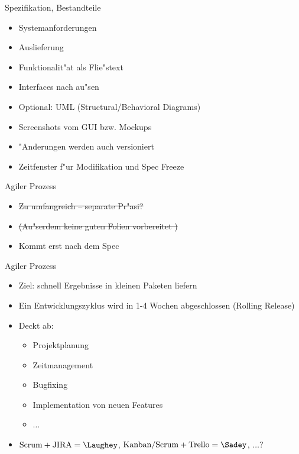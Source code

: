 \documentclass{beamer}
\begin{document}
\begin{frame}{Spezifikation, Bestandteile}
	\begin{itemize}
		\item Systemanforderungen
		\item Auslieferung
		\item Funktionalit"at als Flie"stext
		\item Interfaces nach au"sen
		\item Optional: UML (Structural/Behavioral Diagrams)
		\item Screenshots vom GUI bzw. Mockups
		\item "Anderungen werden auch versioniert
		\item Zeitfenster f"ur Modifikation und Spec Freeze
	\end{itemize}
\end{frame}

\begin{frame}{Agiler Prozess}
	\begin{itemize}
		\item \sout{Zu umfangreich -- separate Pr"asi?}
		\item \sout{(Au"serdem keine guten Folien vorbereitet \Sadey)}
		\item Kommt erst nach dem Spec
	\end{itemize}
\end{frame}

\begin{frame}{Agiler Prozess}
	\begin{itemize}
		\item Ziel: schnell Ergebnisse in kleinen Paketen liefern
		\item Ein Entwicklungszyklus wird in 1-4 Wochen abgeschlossen (Rolling Release)
		\item Deckt ab:
			\begin{itemize}
				\item Projektplanung
				\item Zeitmanagement
				\item Bugfixing
				\item Implementation von neuen Features
				\item $\ldots$
			\end{itemize}
		\item $\text{Scrum} + \text{JIRA} = \Laughey$, $\text{Kanban/Scrum} + \text{Trello} = \Sadey$, $\ldots$?
	\end{itemize}
\end{frame}
\end{document}

